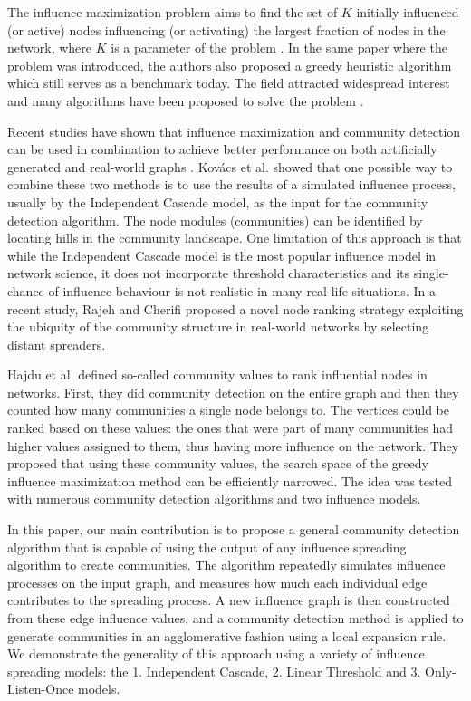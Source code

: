 \documentclass[pdflatex,sn-mathphys-ay]{sn-jnl}
\begin{document}
The influence maximization problem aims to find the set of $K$ initially influenced (or active) nodes influencing (or activating) the largest fraction of nodes in the network, where $K$ is a parameter of the problem \citep{kempe}. In the same paper where the problem was introduced, the authors also proposed a greedy heuristic algorithm which still serves as a benchmark today. The field attracted widespread interest and many algorithms have been proposed to solve the problem \citep{lisurvey}.

Recent studies have shown that influence maximization and community detection can be used in combination to achieve better performance on both artificially generated and real-world graphs \citep{csermely, evaluating, rajeh}. Kovács et al. \citep{csermely} showed that one possible way to combine these two methods is to use the results of a simulated influence process, usually by the Independent Cascade model, as the input for the community detection algorithm. The node modules (communities) can be identified by locating hills in the community landscape. One limitation of this approach is that while the Independent Cascade model is the most popular influence model in network science, it does not incorporate threshold characteristics and its single-chance-of-influence behaviour is not realistic in many real-life situations. In a recent study, Rajeh and Cherifi \citep{rajeh} proposed a novel node ranking strategy exploiting the ubiquity of the community structure in real-world networks by selecting distant spreaders.

Hajdu et al. \citep{evaluating} defined so-called community values to rank influential nodes in networks. First, they did community detection on the entire graph and then they counted how many communities a single node belongs to. The vertices could be ranked based on these values: the ones that were part of many communities had higher values assigned to them, thus having more influence on the network. They proposed that using these community values, the search space of the greedy influence maximization method can be efficiently narrowed. The idea was tested with numerous community detection algorithms and two influence models.

In this paper, our main contribution is to propose a general community detection algorithm that is capable of using the output of any influence spreading algorithm to create communities. The algorithm repeatedly simulates influence processes on the input graph, and measures how much each individual edge contributes to the spreading process. A new influence graph is then constructed from these edge influence values, and a community detection method is applied to generate communities in an agglomerative fashion using a local expansion rule. We demonstrate the generality of this approach using a variety of influence spreading models: the 1. Independent Cascade, 2. Linear Threshold and 3. Only-Listen-Once models.
\end{document}
